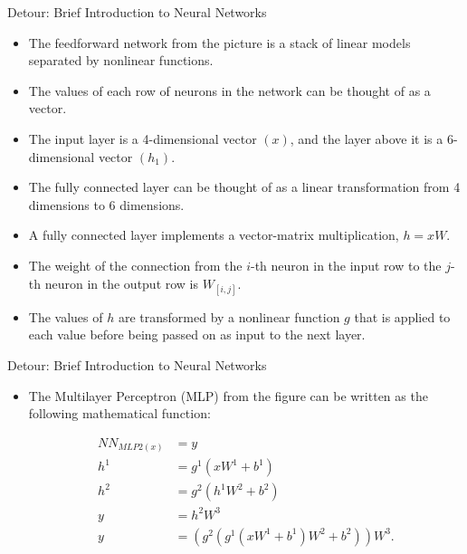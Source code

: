 \begin{frame}{Detour: Brief Introduction to Neural Networks}
\begin{scriptsize}
\begin{itemize}
\item The feedforward network from the picture is a stack of linear models separated by nonlinear functions.
\item The values of each row of neurons in the network can be thought of as a vector. 

\item The input layer is a 4-dimensional vector $(x)$, and the layer above it is a 6-dimensional vector $(h_1)$.
\item The fully connected layer can be thought of as a linear transformation from 4 dimensions to 6 dimensions. 
\item A fully connected layer implements a vector-matrix multiplication, $h=xW$.
\item The weight of the connection from the $i$-th neuron in the input row to the $j$-th neuron in the output row is $W_{[i,j]}$.
\item The values of $h$ are transformed by a nonlinear function $g$ that is applied to each value before being passed on as input to the next layer.

\end{itemize}


\end{scriptsize}
\end{frame}





\begin{frame}{Detour: Brief Introduction to Neural Networks}
\begin{scriptsize}
\begin{itemize}
\item The Multilayer Perceptron (MLP) from the figure can be written as the following mathematical function:
\begin{center}
\begin{equation}
\begin{split}
NN_{MLP2(x)} & =  y  \\
h^{1} &  = g^{1}(xW^{1}+b^{1}) \\
h^{2} &  = g^{2}(h^{1}W^{2}+b^{2}) \\
y &  = h^{2}W^{3}\\
y &  = (g^2(g^1(xW^{1}+b^{1})W^2+b^2))W^3.\\
\end{split}
\end{equation}
\end{center}

\end{itemize}


\end{scriptsize}
\end{frame}


